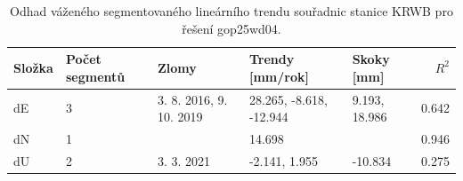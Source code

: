 \begin{table}[htbp]
\caption{Odhad váženého segmentovaného lineárního trendu souřadnic stanice KRWB pro řešení gop25wd04.}
\label{tab:gop25wd04_stcd_krwb_weighted_multiseg}
\begin{tabular}{lllllr}
\toprule
Složka & Počet segmentů & Zlomy & Trendy [mm/rok] & Skoky [mm] & $R^2$ \\
\midrule
dE & 3 & 3. 8. 2016, 9. 10. 2019 & 28.265, -8.618, -12.944 & 9.193, 18.986 & 0.642 \\
dN & 1 &  & 14.698 &  & 0.946 \\
dU & 2 & 3. 3. 2021 & -2.141, 1.955 & -10.834 & 0.275 \\
\bottomrule
\end{tabular}
\end{table}
